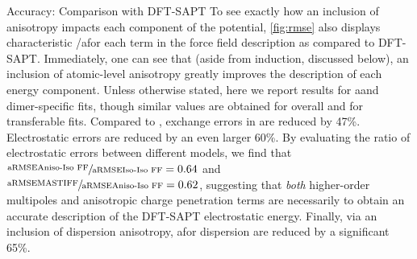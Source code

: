 \begin{subsection}{Accuracy: Comparison with DFT-SAPT}
To see exactly how an inclusion of anisotropy impacts each component of the
potential, \cref{fig:rmse} also displays characteristic \rmse/a\rmse for each term
in the force field description as compared to DFT-SAPT. Immediately, one can
see that (aside from induction, discussed below),
an inclusion of atomic-level anisotropy greatly improves the description of
each energy component. Unless otherwise stated, here we report results
for a\rmse and
dimer-specific fits, though similar values are obtained for overall \rmse and
for transferable fits.
Compared to \isoff, exchange errors in \mastiff
are reduced by 47\%. Electrostatic errors are reduced by an even larger
60\%. By evaluating the ratio of electrostatic errors between different
models, we find that $\sfrac{\text{a\rmse \isaff}}{\text{a\rmse \isoff}} = 0.64$
and $\sfrac{\text{a\rmse \mastiff}}{\text{a\rmse \isaff}} = 0.62$, suggesting
that \emph{both} higher-order multipoles and anisotropic charge penetration
terms are necessarily to obtain an accurate description of the DFT-SAPT
electrostatic energy. Finally, via an inclusion of dispersion anisotropy,
a\rmse for dispersion are reduced by a significant
65\%. 


\end{subsection}
